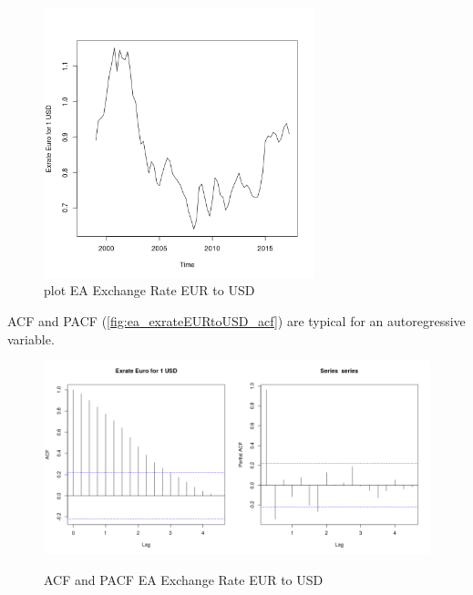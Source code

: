 \documentclass[10pt]{article}
\begin{document}
\begin{figure}[h!]
\centering
\includegraphics[width = 0.7\textwidth]{"../plots/ea_Exrate Euro for 1 USD"}
\caption{plot EA Exchange Rate EUR to USD}
\label{fig:ea_exrateEURtoUSD}
\end{figure}

ACF and PACF (\autoref{fig:ea_exrateEURtoUSD_acf}) are typical for an autoregressive variable.

\begin{figure}[h!]
\centering
\includegraphics[width = 0.5\textwidth]{"../acf/ea_Exrate Euro for 1 USD"}\includegraphics[width = 0.5\textwidth]{"../pacf/ea_Exrate Euro for 1 USD"}
\caption{ACF and PACF EA Exchange Rate EUR to USD}
\label{fig:ea_exrateEURtoUSD_acf}
\end{figure}
\end{document}
